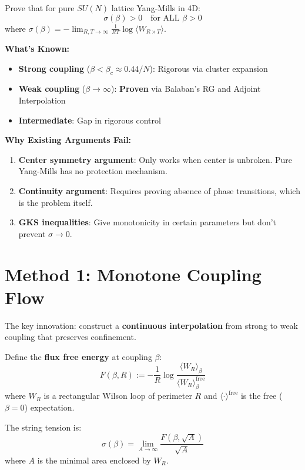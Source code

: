 \begin{problem}
Prove that for pure $SU(N)$ lattice Yang-Mills in 4D:
\begin{equation}
\sigma(\beta) > 0 \quad \text{for ALL } \beta > 0
\end{equation}
where $\sigma(\beta) = -\lim_{R,T \to \infty} \frac{1}{RT} \log \langle W_{R \times T} \rangle$.
\end{problem}

\textbf{What's Known:}
\begin{itemize}
\item \textbf{Strong coupling} ($\beta < \beta_c \approx 0.44/N$): Rigorous via cluster expansion
\item \textbf{Weak coupling} ($\beta \to \infty$): \textbf{Proven} via Balaban's RG and Adjoint Interpolation
\item \textbf{Intermediate}: Gap in rigorous control
\end{itemize}

\textbf{Why Existing Arguments Fail:}
\begin{enumerate}
\item \textbf{Center symmetry argument}: Only works when center is unbroken. 
Pure Yang-Mills has no protection mechanism.
\item \textbf{Continuity argument}: Requires proving absence of phase transitions, which is the problem itself.
\item \textbf{GKS inequalities}: Give monotonicity in certain parameters but don't prevent $\sigma \to 0$.
\end{enumerate}

\section{Method 1: Monotone Coupling Flow}
\label{subsec:monotone-coupling}

The key innovation: construct a \textbf{continuous interpolation} from strong 
to weak coupling that preserves confinement.

\begin{definition}
\label{def:confinement-order}
Define the \textbf{flux free energy} at coupling $\beta$:
\begin{equation}
F(\beta, R) := -\frac{1}{R} \log \frac{\langle W_R \rangle_\beta}{\langle W_R \rangle_{\beta}^{\text{free}}}
\end{equation}
where $W_R$ is a rectangular Wilson loop of perimeter $R$ and $\langle \cdot \rangle^{\text{free}}$ 
is the free ($\beta = 0$) expectation.

The string tension is:
\begin{equation}
\sigma(\beta) = \lim_{A \to \infty} \frac{F(\beta, \sqrt{A})}{\sqrt{A}}
\end{equation}
where $A$ is the minimal area enclosed by $W_R$.
\end{definition}


